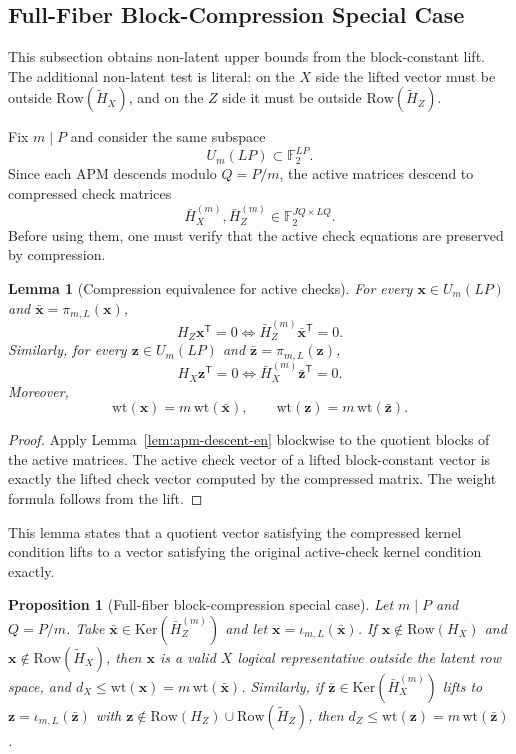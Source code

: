\documentclass[11pt]{article}
\newcommand{\Ftwo}{\mathbb{F}_2}
\newcommand{\Ker}{\mathrm{Ker}}
\newcommand{\Row}{\mathrm{Row}}
\newcommand{\wt}{\mathrm{wt}}
\newcommand{\Htil}{\tilde{H}}
\newcommand{\vect}[1]{\bm{#1}}
\newcommand{\vx}{\vect{x}}
\newcommand{\vz}{\vect{z}}
\theoremstyle{uprightthm}
\newtheorem{lemma}[theorem]{Lemma}
\newtheorem{proposition}[theorem]{Proposition}
\begin{document}
\subsection{Full-Fiber Block-Compression Special Case}
\label{sec:nonlatent-en}
\label{sec:full-fiber-block-en}
This subsection obtains non-latent upper bounds from the block-constant lift.
The additional non-latent test is literal: on the $X$ side the lifted vector
must be outside $\Row(\Htil_X)$, and on the $Z$ side it must be outside
$\Row(\Htil_Z)$.

Fix $m\mid P$ and consider the same subspace
\[
U_m(LP)\subset \Ftwo^{LP}.
\]
Since each APM descends modulo $Q=P/m$, the active matrices descend to compressed check matrices
\[
\bar H_X^{(m)},\bar H_Z^{(m)}\in\Ftwo^{JQ\times LQ}.
\]
Before using them, one must verify that the active check equations are preserved by compression.

\begin{lemma}[Compression equivalence for active checks]
\label{lem:nonlatent-compression-en}
For every $\vx\in U_m(LP)$ and $\bar{\vx}=\pi_{m,L}(\vx)$,
\[
H_Z\vx^{\mathsf T}=0
\iff
\bar H_Z^{(m)}\bar{\vx}^{\mathsf T}=0.
\]
Similarly, for every $\vz\in U_m(LP)$ and $\bar{\vz}=\pi_{m,L}(\vz)$,
\[
H_X\vz^{\mathsf T}=0
\iff
\bar H_X^{(m)}\bar{\vz}^{\mathsf T}=0.
\]
Moreover,
\[
\wt(\vx)=m\,\wt(\bar{\vx}),\qquad \wt(\vz)=m\,\wt(\bar{\vz}).
\]
\end{lemma}

\begin{proof}
Apply Lemma~\ref{lem:apm-descent-en} blockwise to the quotient blocks of the active matrices. The active check vector of a lifted block-constant vector is exactly the lifted check vector computed by the compressed matrix. The weight formula follows from the lift.
\end{proof}

This lemma states that a quotient vector satisfying the compressed kernel
condition lifts to a vector satisfying the original active-check kernel
condition exactly.

\begin{proposition}[Full-fiber block-compression special case]
\label{prop:nonlatent-upper-en}
Let $m\mid P$ and $Q=P/m$. Take $\bar{\vx}\in\Ker(\bar H_Z^{(m)})$ and let $\vx=\iota_{m,L}(\bar{\vx})$. If $\vx\notin \Row(H_X)$ and $\vx\notin \Row(\Htil_X)$, then $\vx$ is a valid $X$ logical representative outside the latent row space, and $d_X\le \wt(\vx)=m\,\wt(\bar{\vx})$. Similarly, if $\bar{\vz}\in\Ker(\bar H_X^{(m)})$ lifts to $\vz=\iota_{m,L}(\bar{\vz})$ with $\vz\notin \Row(H_Z)\cup \Row(\Htil_Z)$, then $d_Z\le \wt(\vz)=m\,\wt(\bar{\vz})$.
\end{proposition}
\end{document}
